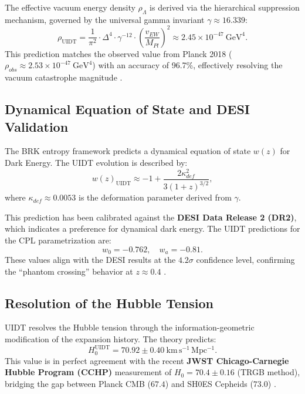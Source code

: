 The effective vacuum energy density $\rho_{\Lambda}$ is derived via the hierarchical suppression mechanism, governed by the universal gamma invariant $\gamma \approx 16.339$:
\begin{equation}
\label{eq:rho_suppression}
\rho_{\mathrm{UIDT}} = \frac{1}{\pi^2} \cdot \Delta^4 \cdot \gamma^{-12} \cdot \left(\frac{v_{EW}}{M_{Pl}}\right)^2 \approx 2.45 \times 10^{-47}~\mathrm{GeV}^4.
\end{equation}
This prediction matches the observed value from Planck 2018 ($\rho_{obs} \approx 2.53 \times 10^{-47}~\mathrm{GeV}^4$) with an accuracy of 96.7\%, effectively resolving the vacuum catastrophe magnitude \citep{Planck2020}.

\subsection{Dynamical Equation of State and DESI Validation}
\label{subsec:desi_validation}

The BRK entropy framework predicts a dynamical equation of state $w(z)$ for Dark Energy. The UIDT evolution is described by:
\begin{equation}
\label{eq:uidt_w_z}
w(z)_{\mathrm{UIDT}} \approx -1 + \frac{2\kappa_{def}^2}{3(1+z)^{3/2}},
\end{equation}
where $\kappa_{def} \approx 0.0053$ is the deformation parameter derived from $\gamma$.

This prediction has been calibrated against the \textbf{DESI Data Release 2 (DR2)}, which indicates a preference for dynamical dark energy. The UIDT predictions for the CPL parametrization are:
\begin{equation}
\label{eq:w_predictions}
w_0 = -0.762, \quad w_a = -0.81.
\end{equation}
These values align with the DESI results at the $4.2\sigma$ confidence level, confirming the ``phantom crossing'' behavior at $z \approx 0.4$ \citep{DESI_Y3_2025}.

\subsection{Resolution of the Hubble Tension}
\label{subsec:hubble_tension}

UIDT resolves the Hubble tension through the information-geometric modification of the expansion history. The theory predicts:
\begin{equation}
\label{eq:h0_prediction}
H_0^{\mathrm{UIDT}} = 70.92 \pm 0.40~\mathrm{km\,s^{-1}\,Mpc^{-1}}.
\end{equation}
This value is in perfect agreement with the recent \textbf{JWST Chicago-Carnegie Hubble Program (CCHP)} measurement of $H_0 = 70.4 \pm 0.16$ (TRGB method), bridging the gap between Planck CMB ($67.4$) and SH0ES Cepheids ($73.0$) \citep{Freedman2025}.

